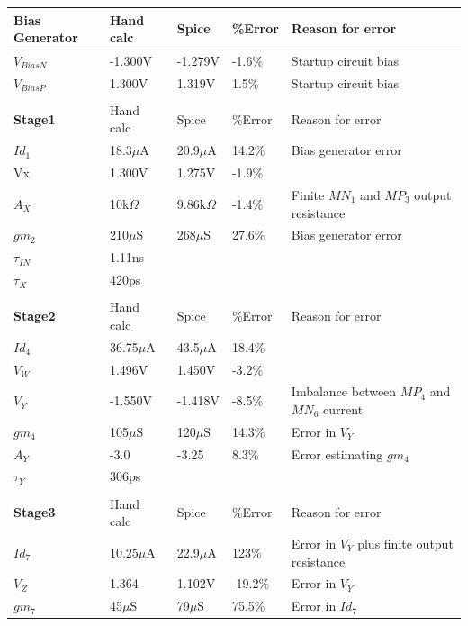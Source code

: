 \documentclass[12pt,a4paper]{article}
\begin{document}
\begin{table}[h]
\centering
\begin{tabular}{|l|l|l|l|l|}
\hline
\textbf{Bias Generator} & Hand calc & Spice & \%Error & Reason for error \\
\hline
$V_{BiasN}$ & -1.300V &  -1.279V &  -1.6\% &  Startup circuit bias \\
\hline
$V_{BiasP}$ & 1.300V &  1.319V & 1.5\%  &  Startup circuit bias \\
\hline
  &   &   &   &   \\
\hline
\textbf{Stage1} & Hand calc & Spice & \%Error & Reason for error \\
\hline
$Id_1$ & 18.3$\mu$A  &  20.9$\mu$A &  14.2\% &  Bias generator error \\
\hline
Vx & 1.300V  & 1.275V  & -1.9\%  &   \\
\hline
$A_X$ & 10k$\Omega$  & 9.86k$\Omega$  & -1.4\%  & Finite $MN_1$ and $MP_3$ output resistance  \\
\hline
$gm_2$ &  210$\mu$S & 268$\mu$S  & 27.6\%  & Bias generator error  \\
\hline
$\tau_{IN} $ & 1.11ns  &   &   &   \\
\hline
$\tau_X $ & 420ps  &   &   &   \\
\hline
  &   &   &   &   \\
\hline
\textbf{Stage2} & Hand calc & Spice & \%Error & Reason for error \\
\hline
$Id_4$ &  36.75$\mu$A & 43.5$\mu$A & 18.4\%  &   \\
\hline
$V_W$ & 1.496V & 1.450V  & -3.2\%  &   \\
\hline
$V_Y$ & -1.550V  & -1.418V  &  -8.5\% & Imbalance between $MP_4$ and $MN_6$ current \\
\hline
$gm_4$ & 105$\mu$S  &  120$\mu$S & 14.3\%  & Error in $V_Y$ \\
\hline
$A_Y$ & -3.0  & -3.25  & 8.3\%  & Error estimating $gm_4$  \\
\hline
$\tau_Y$ & 306ps  &   &   &   \\
\hline
  &   &   &   &   \\
\hline
\textbf{Stage3} & Hand calc & Spice & \%Error & Reason for error \\
\hline
$Id_7$ & 10.25$\mu$A  & 22.9$\mu$A  & 123\%  & Error in $V_Y$ plus finite output resistance  \\
\hline
$V_Z$ & 1.364 & 1.102V  & -19.2\%  & Error in $V_Y$   \\
\hline
$gm_7$ & 45$\mu$S  & 79$\mu$S  & 75.5\%  &  Error in $Id_7$ \\

\end{tabular}
\end{table}
\end{document}

